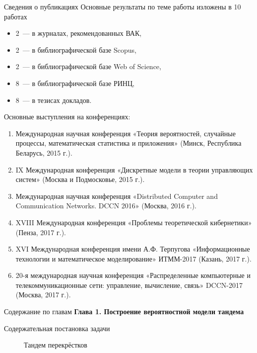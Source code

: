 \documentclass[10pt]{beamer}
\begin{document}
\begin{frame}{Сведения о публикациях}
Основные результаты по теме работы изложены в 10 работах
    \begin{itemize}
        \item 2~--- в журналах, рекомендованных ВАК,
        \item 2~--- в библиографической базе Scopus, 
        \item 2~--- в библиографической базе Web of Science, 
        \item 8~--- в библиографической базе РИНЦ,
        \item 8~--- в тезисах докладов.
    \end{itemize}
\end{frame}
\begin{frame}{Основные выступления на конференциях:}
  \begin{enumerate}
 \item Международная
научная конференция «Теория вероятностей, случайные процессы, математическая статистика и приложения» (Минск, Республика Беларусь, 2015 г.).
\item IX Международная конференция «Дискретные модели в теории управляющих систем» (Москва и Подмосковье, 2015 г.).
\item Международная
научная конференция «Distributed Computer and Communication
Networks. DCCN 2016» (Москва, 2016 г.).
\item XVIII Международная конференция «Проблемы теоретической кибернетики» (Пенза, 2017 г.).
\item XVI Международная конференция имени А.Ф. Терпугова «Информационные
технологии и математическое моделирование» ИТММ-2017 (Казань, 2017 г.).
\item 20-я международная научная конференция «Распределенные компьютерные и телекоммуникационные сети: управление, вычисление, связь» DCCN-2017 (Москва, 2017 г.).
  \end{enumerate} 
  \end{frame}
  
  \begin{frame}{Содержание по главам}
  \Large{\textbf{Глава 1. Построение вероятностной модели тандема}}\par


      \end{frame}
  
\begin{frame}{Содержательная постановка задачи}
        \begin{figure}[h]
    \centering
    \caption{Тандем перекрёстков}
    \label{VK:fig:1}
  \end{figure}
\end{frame}
\end{document}
